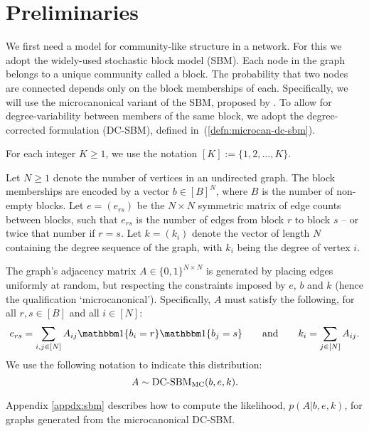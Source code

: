\section{Preliminaries}

We first need a model for community-like structure in a network. For this we adopt the widely-used stochastic block model (SBM).
Each node in the graph belongs to a unique community called a block. The probability that two nodes are connected depends only on the block memberships of each. Specifically, we will use the microcanonical variant of the SBM, proposed by \citet{Peixoto-Bayesian-Microcanonical}. To allow for degree-variability between members of the same block, we adopt the degree-corrected formulation (DC-SBM), defined in~(\ref{defn:microcan-dc-sbm}).

For each integer $K\geq 1$, we use the notation $[K]:=\{1,2,\ldots,K\}$.

\begin{definition}
	\label{defn:microcan-dc-sbm}
	Let $N \geq 1$ denote the number of vertices in an undirected graph. The block memberships are encoded by a vector $b \in [B]^N$,
where $B$ is the number of non-empty blocks.
	Let $e=(e_{rs})$ be the $N\times N$ symmetric matrix of edge counts 
between blocks, such that $e_{rs}$ is the number of edges from block $r$ to 
block $s$ -- or twice that number if $r=s$. 
	Let $k =(k_i)$ denote the vector of length $N$ containing the degree
sequence of the graph, with $k_i$ being the degree of vertex $i$.

The graph's adjacency matrix $A \in \{0,1\}^{N \times N}$ is generated 
by placing edges uniformly at random, but respecting the constraints 
imposed by $e$, $b$ and $k$ (hence the qualification `microcanonical').
Specifically, $A$ must satisfy the following, for all $r,s\in[B]$
and all $i\in[N]$:
	\begin{equation}
		e_{rs} = \sum_{i, j \in [N]} A_{ij} 
	\one \{b_i = r\} \one \{b_j = s\} 
		\qquad 
		\textrm{and} \qquad
		k_i = \sum_{j \in [N]} A_{ij}.
		\label{eqn:sbm-constraints}
	\end{equation}
We use the following notation to indicate this distribution:
\begin{equation}
		A \sim \mbox{\rm DC-SBM}_{\rm MC} (b, e, k).
	\end{equation}
\end{definition}

Appendix \ref{appdx:sbm} describes how to compute the likelihood, $p(A|b,e,k)$, for graphs generated from the microcanonical DC-SBM.

